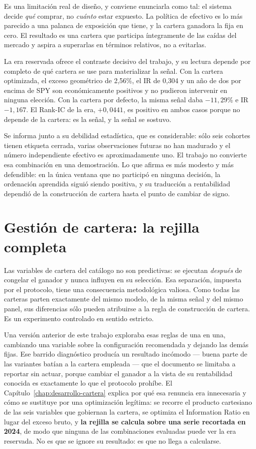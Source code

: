 Es una limitación real de diseño, y conviene enunciarla como tal: el sistema decide \emph{qué}
comprar, no \emph{cuánto} estar expuesto. La política de efectivo es lo más parecido a una palanca
de exposición que tiene, y la cartera ganadora la fija en cero. El resultado es una cartera que
participa íntegramente de las caídas del mercado y aspira a superarlas en términos relativos, no a
evitarlas.

La era reservada ofrece el contraste decisivo del trabajo, y su lectura depende por completo de qué
cartera se use para materializar la señal. Con la cartera optimizada, el exceso geométrico de
2,56\%, el IR de 0,304 y un año de dos por encima de SPY son económicamente positivos y no pudieron
intervenir en ninguna elección. Con la cartera por defecto, la misma señal daba $-11,29$\% e IR
$-1,167$. El Rank-IC de la era, $+0,0441$, es positivo en ambos casos porque no depende de la
cartera: es la señal, y la señal se sostuvo.

Se informa junto a su debilidad estadística, que es considerable: sólo seis cohortes tienen etiqueta
cerrada, varias observaciones futuras no han madurado y el número independiente efectivo es
aproximadamente uno. El trabajo no convierte esa combinación en una demostración. Lo que afirma es
más modesto y más defendible: en la única ventana que no participó en ninguna decisión, la
ordenación aprendida siguió siendo positiva, y su traducción a rentabilidad dependió de la
construcción de cartera hasta el punto de cambiar de signo.

\section{Gestión de cartera: la rejilla completa}
\label{sec:cartera-rejilla}

Las variables de cartera del catálogo no son predictivas: se ejecutan \emph{después} de congelar el
ganador y nunca influyen en su selección. Esa separación, impuesta por el protocolo, tiene una
consecuencia metodológica valiosa. Como todas las carteras parten exactamente del mismo modelo, de
la misma señal y del mismo panel, sus diferencias sólo pueden atribuirse a la regla de construcción
de cartera. Es un experimento controlado en sentido estricto.

Una versión anterior de este trabajo exploraba esas reglas de una en una, cambiando una variable
sobre la configuración recomendada y dejando las demás fijas. Ese barrido diagnóstico producía un
resultado incómodo --- buena parte de las variantes batían a la cartera empleada --- que el
documento se limitaba a reportar sin actuar, porque cambiar el ganador a la vista de su rentabilidad
conocida es exactamente lo que el protocolo prohíbe. El Capítulo~\ref{chap:desarrollo-cartera}
explica por qué esa renuncia era innecesaria y cómo se sustituye por una optimización legítima: se
recorre el producto cartesiano de las seis variables que gobiernan la cartera, se optimiza el
Information Ratio en lugar del exceso bruto, y \textbf{la rejilla se calcula sobre una serie
recortada en 2024}, de modo que ninguna de las combinaciones evaluadas puede ver la era reservada.
No es que se ignore su resultado: es que no llega a calcularse.

